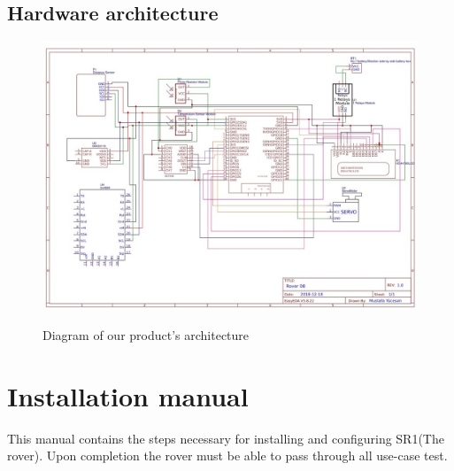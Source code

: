 \documentclass[12pt]{article}
\begin{document}
 	\subsection{Hardware architecture}
 	\begin{figure}[H]
 		\centering
 		\includegraphics[width=\linewidth]{HardwareArch.jpeg}\\
 		\caption{Diagram of our product's architecture}
 	\end{figure}
	\newpage
 	\section{Installation manual}
 	This manual contains the steps necessary for installing and configuring SR1(The rover). Upon completion the rover must be able to pass through all use-case test.\\
\end{document}
